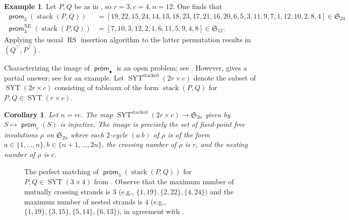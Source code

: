 \documentclass{amsart}
\newtheorem{corollary}[theorem]{Corollary}
\theoremstyle{definition}
\newtheorem{example}[theorem]{Example}
\DeclareMathOperator{\RS}{RS}
\DeclareMathOperator{\SYT}{SYT}
\DeclareMathOperator{\stack}{stack}
\DeclareMathOperator{\stacked}{stacked}
\DeclareMathOperator{\NE}{NE}
\DeclareMathOperator{\prom}{\mathsf{prom}}
\begin{document}
\begin{example}\label{ex:prom-RS}
    Let $P, Q$ be as in , so $r=3, c=4, n=12$. One finds that
    \begin{align*}
      \prom_3(\stack(P, Q))
        &= [19, 22, 15, 24, 14, 13, 18, 23, 17, 21, 16, 20, 6, 5, 3, 11, 9, 7, 1, 12, 10, 2, 8, 4] \in \mathfrak{S}_{24} \\
      \prom_3^{\NE}(\stack(P, Q))
        &= [7, 10, 3, 12, 2, 1, 6, 11, 5, 9, 4, 8] \in \mathfrak{S}_{12}.
    \end{align*}
    Applying the usual $\RS$ insertion algorithm to the latter permutation results in $(Q^\top, P^\top)$. 
\end{example}

Characterizing the image of $\prom_\bullet$ is an open problem; see . However,  gives a partial answer; see  for an example. Let $\SYT^{\stacked}(2r \times c)$ denote the subset of $\SYT(2r \times c)$ consisting of tableaux of the form $\stack(P, Q)$ for $P, Q \in \SYT(r \times c)$.

\begin{corollary}\label{cor:prom-RS}
    Let $n = rc$. The map $\SYT^{\stacked}(2r \times c) \to \mathfrak{S}_{2n}$ given by $S \mapsto \prom_r(S)$ is injective. The image is precisely the set of fixed-point free involutions $\rho$ on $\mathfrak{S}_{2n}$ where each $2$-cycle $(a\ b)$ of $\rho$ is of the form $a \in \{1, \ldots, n\}, b \in \{n+1, \ldots, 2n\}$, the crossing number of $\rho$ is $r$, and the nesting number of $\rho$ is $c$.
\end{corollary}

\begin{figure}[hbtp]
    \centering
    

    \caption{The perfect matching of $\prom_3(\stack(P, Q))$ for $P, Q \in \SYT(3 \times 4)$ from . Observe that the maximum number of mutually crossing strands is $3$ (e.g., $\{1, 19\}, \{2, 22\}, \{4, 24\}$) and the maximum number of nested strands is $4$ (e.g., $\{1, 19\}, \{3, 15\}, \{5, 14\}, \{6, 13\})$, in agreement with .}
    \label{fig:matching-alt}
\end{figure}
\end{document}
